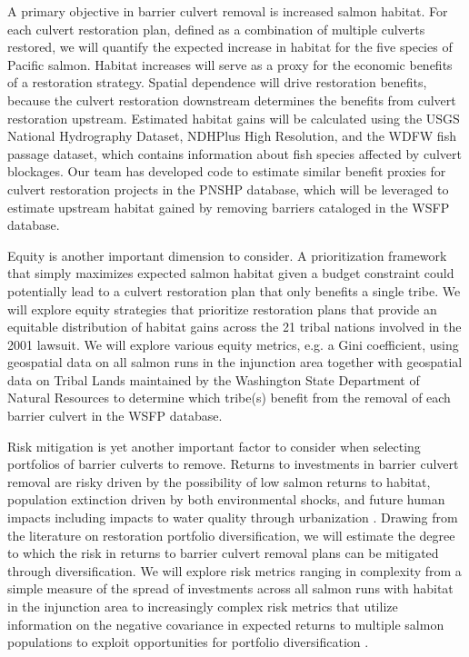 \documentclass[12pt]{elsarticle}
\begin{document}
A primary objective in barrier culvert removal is increased salmon habitat. For each culvert restoration plan, defined as a combination of multiple culverts restored, we will quantify the expected increase in habitat for the five species of Pacific salmon. Habitat increases will serve as a proxy for the economic benefits of a restoration strategy. Spatial dependence will drive restoration benefits, because the culvert restoration downstream determines the benefits from culvert restoration upstream. Estimated habitat gains will be calculated using the USGS National Hydrography Dataset, NDHPlus High Resolution, and the WDFW fish passage dataset, which contains information about fish species affected by culvert blockages.  Our team has developed code to estimate similar benefit proxies for culvert restoration projects in the PNSHP database, which will be leveraged to estimate upstream habitat gained by removing barriers cataloged in the WSFP database. 

%
Equity is another important dimension to consider. A prioritization framework that simply maximizes expected salmon habitat given a budget constraint could potentially lead to a culvert restoration plan that only benefits a single tribe. We will explore equity strategies that prioritize restoration plans that provide an equitable distribution of habitat gains across the 21 tribal nations involved in the 2001 lawsuit. We will explore various equity metrics, e.g. a Gini coefficient, using geospatial data on all salmon runs in the injunction area together with geospatial data on Tribal Lands maintained by the Washington State Department of Natural Resources to determine which tribe(s) benefit from the removal of each barrier culvert in the WSFP database. 

%
Risk mitigation is yet another important factor to consider when selecting portfolios of barrier culverts to remove. Returns to investments in barrier culvert removal are risky driven by the possibility of low salmon returns to habitat, population extinction driven by both environmental shocks, and future human impacts including impacts to water quality through urbanization \citep{ettinger2021prioritizing}. Drawing from the literature on restoration portfolio diversification, we will estimate the degree to which the risk in returns to barrier culvert removal plans can be mitigated through diversification. We will explore risk metrics ranging in complexity from a simple measure of the spread of investments across all salmon runs with habitat in the injunction area to increasingly complex risk metrics that utilize information on the negative covariance in expected returns to multiple salmon populations to exploit opportunities for portfolio diversification \citep{sanchirico2008empirical, jardine2015fishermen, johnston2002combining}.  
\end{document}

